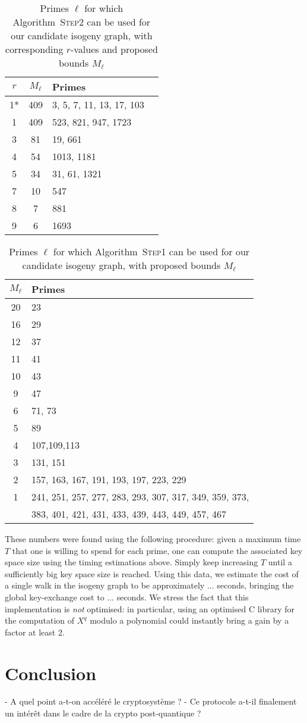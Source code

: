 \documentclass{article}
\newcommand{\algstyle}[1]{\textsc{#1}}
\theoremstyle{definition}
\begin{document}
\begin{table}
\centering
\begin{tabular}{cclc}
$r$ & $M_\ell$ & Primes \\
\hline
1* & 409 & 3, 5, 7, 11, 13, 17, 103 \\
1 & 409 & 523, 821, 947, 1723 \\
3 & 81 & 19, 661 \\
4 & 54 & 1013, 1181 \\
5 & 34 & 31, 61, 1321 \\
7 & 10 & 547 \\
8 & 7 & 881 \\
9 & 6 & 1693
\end{tabular}
    \caption{Primes $\ell$ for which Algorithm~\algstyle{Step2} can be
    used for our candidate isogeny graph,
    with corresponding $r$-values and proposed bounds $M_\ell$}
    \label{tab:step2s}
\end{table}

\begin{table}
\begin{tabular}{cl}
$M_\ell$ & Primes \\
\hline
20 & 23  \\
16 & 29  \\
12 & 37  \\
11 & 41  \\
10 & 43  \\
9  & 47  \\
6  & 71, 73  \\
5  & 89  \\
4  & 107,109,113  \\
3  & 131, 151  \\
2  & 157, 163, 167, 191,
     193,
     197,
     223,
     229  \\
1 &  241,
     251,
     257,
     277,
     283,
     293,
     307,
     317,
     349,
     359,
     373,
	\\ &
     383,
     401,
     421,
     431,
     433,
     439,
     443,
     449,
     457,
     467 \\
\end{tabular}
    \caption{Primes $\ell$ for which Algorithm~\algstyle{Step1} can be
    used for our candidate isogeny graph, with proposed bounds $M_\ell$}
    \label{tab:step1s}
\end{table}


These numbers were found using the following procedure: given a maximum time
$T$ that one is willing to spend for each prime, one can compute the
associated key space size using the timing estimations above. Simply keep
increasing $T$ until a sufficiently big key space size is reached.
Using this data, we estimate the cost of a single walk in the
isogeny graph to be approximately ... seconds, bringing the global
key-exchange cost to ... seconds. We stress the fact that this implementation
is \emph{not} optimised: in particular, using an optimised C library
for the computation of $X^q$ modulo a polynomial could instantly bring a
gain by a factor at least 2.


\section{Conclusion}

- A quel point a-t-on accéléré le cryptosystème ?
- Ce protocole a-t-il finalement un intérêt dans le cadre de la crypto post-quantique ?




\end{document}
